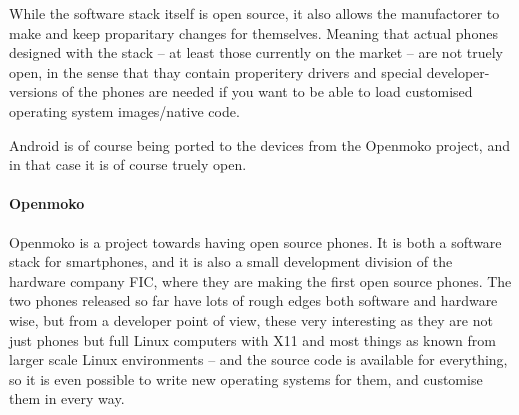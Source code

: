 \documentclass[11pt]{report}
\begin{document}
While the software stack itself is open source, it also allows the manufactorer to make and keep proparitary changes for themselves. 
Meaning that actual phones designed with the stack -- at least those currently on the market -- are not truely open, in the sense that thay contain properitery drivers and special developer-versions of the phones are needed if you want to be able to load customised operating system images/native code.

Android is of course being ported to the devices from the Openmoko project, and in that case it is of course truely open.

\paragraph{Openmoko}
Openmoko is a project towards having open source phones.
It is both a software stack for smartphones, and it is also a small development division of the hardware company FIC, where they are making the first open source phones.
The two phones released so far have lots of rough edges both software and hardware wise, but from a developer point of view, these very interesting as they are not just phones but full Linux computers with X11 and most things as known from larger scale Linux environments -- and the source code is available for everything, so it is even possible to write new operating systems for them, and customise them in every way.


\end{document}

